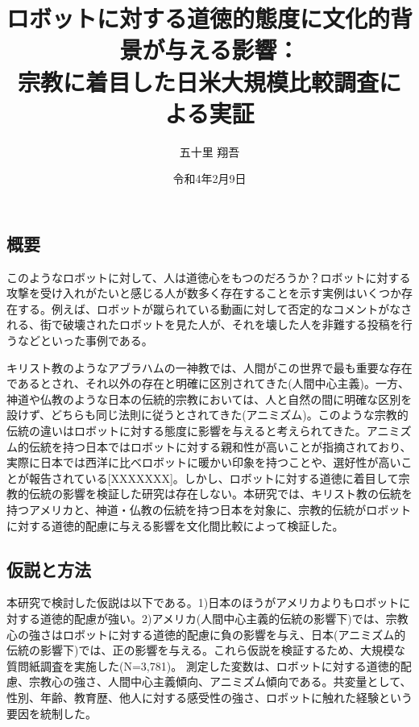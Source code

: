 \documentclass[twocolumn, a4j,10pt]{jarticle}
\title{ロボットに対する道徳的態度に文化的背景が与える影響：\\宗教に着目した日米大規模比較調査による実証}
\author{五十里 翔吾}
\date{令和4年2月9日}
\begin{document}
\maketitle
\vspace{-7mm}
\subsection*{概要}\vspace{-3mm}
このようなロボットに対して、人は道徳心をもつのだろうか？ロボットに対する攻撃を受け入れがたいと感じる人が数多く存在することを示す実例はいくつか存在する。例えば、ロボットが蹴られている動画に対して否定的なコメントがなされる、街で破壊されたロボットを見た人が、それを壊した人を非難する投稿を行うなどといった事例である。


キリスト教のようなアブラハムの一神教では、人間がこの世界で最も重要な存在であるとされ、それ以外の存在と明確に区別されてきた(人間中心主義)。一方、神道や仏教のような日本の伝統的宗教においては、人と自然の間に明確な区別を設けず、どちらも同じ法則に従うとされてきた(アニミズム)。このような宗教的伝統の違いはロボットに対する態度に影響を与えると考えられてきた。アニミズム的伝統を持つ日本ではロボットに対する親和性が高いことが指摘されており、実際に日本では西洋に比べロボットに暖かい印象を持つことや、選好性が高いことが報告されている[XXXXXXX]。しかし、ロボットに対する道徳に着目して宗教的伝統の影響を検証した研究は存在しない。本研究では、キリスト教の伝統を持つアメリカと、神道・仏教の伝統を持つ日本を対象に、宗教的伝統がロボットに対する道徳的配慮に与える影響を文化間比較によって検証した。
\vspace{-7mm}
\subsection*{仮説と方法} \vspace{-3mm}
本研究で検討した仮説は以下である。1)日本のほうがアメリカよりもロボットに対する道徳的配慮が強い。2)アメリカ(人間中心主義的伝統の影響下)では、宗教心の強さはロボットに対する道徳的配慮に負の影響を与え、日本(アニミズム的伝統の影響下)では、正の影響を与える。これら仮説を検証するため、大規模な質問紙調査を実施した(N=3,781)。
測定した変数は、ロボットに対する道徳的配慮、宗教心の強さ、人間中心主義傾向、アニミズム傾向である。共変量として、性別、年齢、教育歴、他人に対する感受性の強さ、ロボットに触れた経験という要因を統制した。
\vspace{-7mm}
\end{document}
